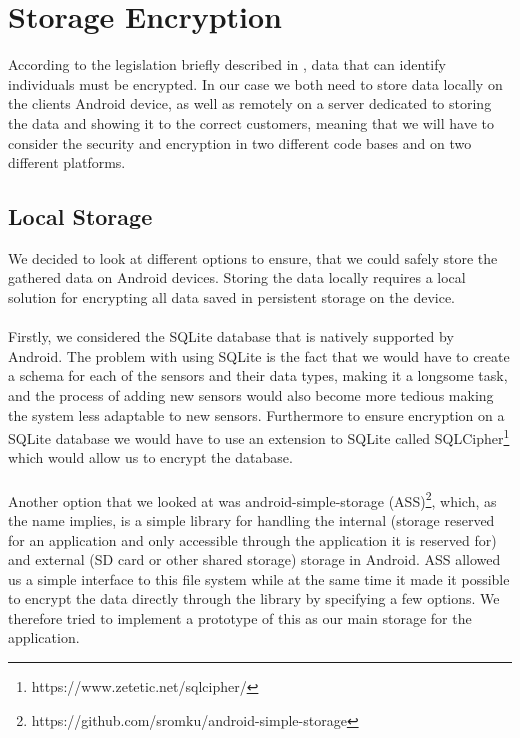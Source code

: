 
\section{Storage Encryption}
\label{sec:storage_encryption}
According to the legislation briefly described in , data that can identify individuals must be encrypted. In our case we both need to store data locally on the clients Android device, as well as remotely on a server dedicated to storing the data and showing it to the correct customers, meaning that we will have to consider the security and encryption in two different code bases and on two different platforms. 

\subsection{Local Storage}
\label{sub:local_storage}
We decided to look at different options to ensure, that we could safely store the gathered data on Android devices. Storing the data locally requires a local solution for encrypting all data saved in persistent storage on the device. 
\\\\
Firstly, we considered the SQLite database that is natively supported by Android. The problem with using SQLite is the fact that we would have to create a schema for each of the sensors and their data types, making it a longsome task, and the process of adding new sensors would also become more tedious making the system less adaptable to new sensors. Furthermore to ensure encryption on a SQLite database we would have to use an extension to SQLite called SQLCipher\footnote{https://www.zetetic.net/sqlcipher/} which would allow us to encrypt the database. 
\\\\
Another option that we looked at was android-simple-storage (ASS)\footnote{https://github.com/sromku/android-simple-storage}, which, as the name implies, is a simple library for handling the internal (storage reserved for an application and only accessible through the application it is reserved for) and external (SD card or other shared storage) storage in Android. ASS allowed us a simple interface to this file system while at the same time it made it possible to encrypt the data directly through the library by specifying a few options. We therefore tried to implement a prototype of this as our main storage for the application. 

